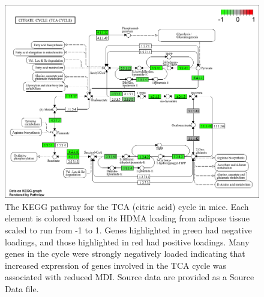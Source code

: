 \documentclass[
]{article}
\begin{document}
\begin{figure}[ht!]
\includegraphics[width=\textwidth]{Figures/Supp_Fig_TCA.png} 
\caption{The KEGG pathway for the TCA (citric acid) cycle in 
mice. Each element is colored based on its HDMA loading from adipose
tissue scaled to run from -1 to 1. Genes highlighted in green had 
negative loadings, and those highlighted in red had positive loadings. 
Many genes in the cycle were strongly negatively loaded indicating 
that increased expression of genes involved in the TCA cycle was 
associated with reduced MDI. Source data are provided as a Source 
Data file.
}
\label{fig:TCA_cycle}
\end{figure}
\end{document}
